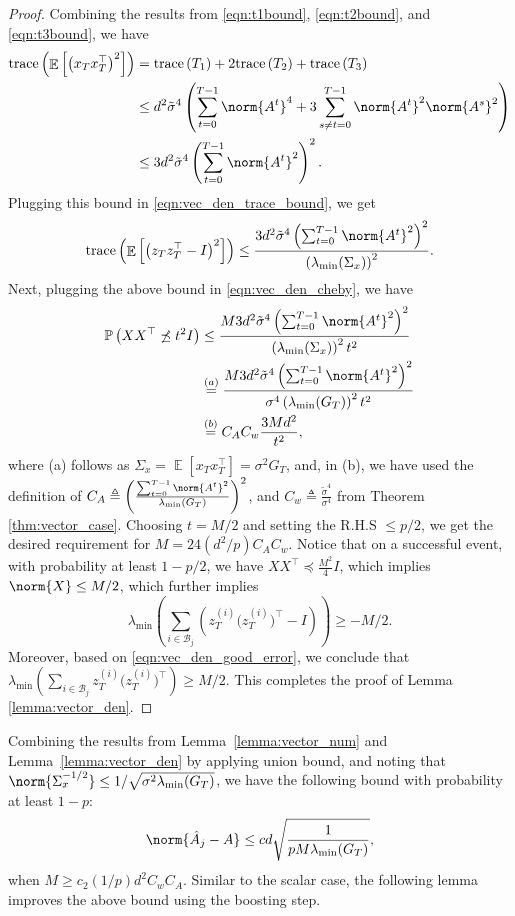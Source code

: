 \documentclass[letterpaper, 11 pt]{article}
\newcommand{\mc}{\mathcal}
\newcommand{\tr}[1]{\text{trace}\left( #1 \right)}
\DeclareMathOperator{\E}{\mathbb{E}}
\begin{document}
\begin{proof}
Combining the results from \eqref{eqn:t1bound}, \eqref{eqn:t2bound}, and \eqref{eqn:t3bound}, we have
\begin{align*}
    \tr{\E\left[\left(x_T x_T^{\top}\right)^2\right]} &= \tr{T_1} + 2\tr{T_2} + \tr{T_3} \\
    &\leq d^2 \tilde{\sigma}^4 \left(\sum_{t=0}^{T-1} \norm{A^t}^4 + 3\sum_{s\neq t=0}^{T-1} \norm{A^t}^2 \norm{A^s}^2 \right) \\
    &\leq 3d^2 \tilde{\sigma}^4 \left(\sum_{t=0}^{T-1} \norm{A^t}^2\right)^2.
\end{align*}
Plugging this bound in \eqref{eqn:vec_den_trace_bound}, we get $$\tr{\E\left[\left(z_T z_T^{\top} - I\right)^2\right]} \leq \frac{3d^2 \tilde{\sigma}^4 \left(\sum_{t=0}^{T-1} \norm{A^t}^2\right)^2}{\left(\lambda_{\min}{(\Sigma_x)}\right)^2}.$$
Next, plugging the above bound in \eqref{eqn:vec_den_cheby}, we have 
\begin{align}
    \mathbb{P}\left( XX^{\top} \not \preceq t^2 I \right) & \leq \frac{M 3d^2 \tilde{\sigma}^4 \left(\sum_{t=0}^{T-1} \norm{A^t}^2\right)^2}{\left(\lambda_{\min}{(\Sigma_x)}\right)^2t^2} \nonumber \\
    & \overset{(a)}{=} \frac{M 3d^2 \tilde{\sigma}^4 \left(\sum_{t=0}^{T-1} \norm{A^t}^2\right)^2}{\sigma^4\left(\lambda_{\min}{(G_T)}\right)^2t^2} \nonumber \\
    & \overset{(b)}{=} C_AC_w \frac{3Md^2}{t^2}, \nonumber
\end{align}
where (a) follows as $\Sigma_x = \E[x_Tx_T^{\top}] = \sigma^2 G_T$, and, in (b), we have used the definition of ${C_A} \triangleq \left(\frac{\sum_{t=0}^{T-1} \norm{A^t}^2}{\lambda_{\min}(G_T)}\right)^2$, and $C_w \triangleq \frac{\tilde{\sigma}^4}{\sigma^4}$ from Theorem \ref{thm:vector_case}. Choosing $t = M/2$ and setting the R.H.S $\leq p/2$, we get the desired requirement for $M = 24(d^2/p)C_AC_w$. Notice that on a successful event, with probability at least $1 - p/2$, we have $XX^{\top} \preceq \frac{M^2}{4} I$, which implies $\norm{X} \leq M/2$, which further implies $$\lambda_{\min}\left(\sum_{i \in \mc{B}_j} \left( z_T^{(i)}\big(z_T^{(i)}\big)^{\top} - I \right)\right) \geq -M/2.$$ Moreover, based on \eqref{eqn:vec_den_good_error}, we conclude that $\lambda_{\min}\left(\sum_{i \in \mc{B}_j} z_T^{(i)}\big(z_T^{(i)}\big)^{\top}\right) \geq M/2$. This completes the proof of Lemma \ref{lemma:vector_den}.
\end{proof}

Combining the results from Lemma~\ref{lemma:vector_num} and Lemma~\ref{lemma:vector_den} by applying union bound, and noting that $\norm{\Sigma_x^{-1/2}} \leq 1/\sqrt{\sigma^2\lambda_{\min}(G_T)}$, we have the following bound with probability at least $1-p$:
\begin{equation}
   \norm{\hat{A}_j - A} \leq c d\sqrt{\frac{1}{p M \lambda_{\min}(G_T)}},
   \label{eqn:vector_bound_pre_boost}
\end{equation}
when $M \geq c_2 (1/p) d^2 C_w C_A$. Similar to the scalar case, the following lemma improves the above bound using the boosting step.
\end{document}
